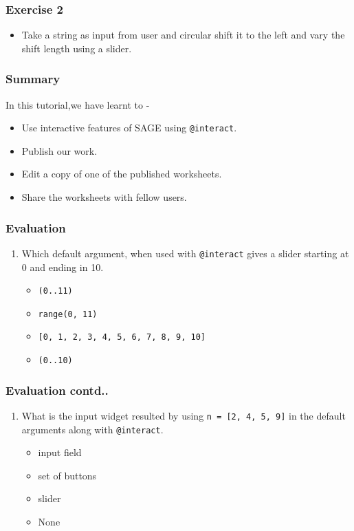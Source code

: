 \documentclass[17pt,compress]{beamer}
\newcounter{saveenumi}
\newcommand{\seti}{\setcounter{saveenumi}{\value{enumi}}}
\newcommand{\conti}{\setcounter{enumi}{\value{saveenumi}}}
\begin{document}
\begin{frame}
\frametitle{Exercise 2}
\label{sec-5}


\begin{itemize}
\item Take a string as input from user and circular shift it to the left and
  vary the shift length using a slider.
\end{itemize}
\end{frame}
\begin{frame}
\frametitle{Summary}
\label{sec-6}

  In this tutorial,we have learnt to -


\begin{itemize}
\item Use interactive features of SAGE using \texttt{@interact}.
\item Publish our work.
\item Edit a copy of one of the published worksheets.
\item Share the worksheets with fellow users.
\end{itemize}
\end{frame}
\begin{frame}
\frametitle{Evaluation}
\label{sec-7.1}


\begin{enumerate}
\item Which default argument, when used with \texttt{@interact} gives a slider 
    starting at 0 and ending in 10.\pause
	\begin{itemize}
	\item \texttt{(0..11)}
	\item \texttt{range(0, 11)}
	\item \texttt{[0, 1, 2, 3, 4, 5, 6, 7, 8, 9, 10]}
	\item \texttt{(0..10)}
	\end{itemize}
\seti
\end{enumerate}
\end{frame}
\begin{frame}
\frametitle{Evaluation contd..}
\label{sec-7.2}


\begin{enumerate}
\conti
\item What is the input widget resulted by using \texttt{n = [2, 4, 5, 9]} in the
    default arguments along with \texttt{@interact}.\pause
	\begin{itemize}
	\item input field
	\item set of buttons
	\item slider
	\item None
	\end{itemize}
\end{enumerate}
\end{frame}
\end{document}
